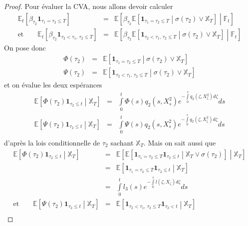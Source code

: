 \documentclass[a4paper]{article}
\theoremstyle{definition}
\theoremstyle{remark}
\begin{document}
\begin{proof}
Pour évaluer la CVA, nous allons devoir calculer 
\begin{eqnarray*}
\mathbb{E}_t \left[ \beta_{\tau_2} \mathbf{1}_{\tau_1 = \tau_2 \leq T} \right] &=& \mathbb{E} \left[ \beta_{\tau_2} \mathbb{E} \left[ \mathbf{1}_{\tau_1 = \tau_2 \leq T} \middle| \sigma (\tau_2) \vee \mathbb{X}_T \right] \middle| \mathbb{F}_t \right] \\
\text{et} \qquad
\mathbb{E}_t \left[ \beta_{\tau_2} \mathbf{1}_{\tau_2 < \tau_1,\, \tau_2 \leq T} \right] &=& \mathbb{E} \left[ \beta_{\tau_2} \mathbb{E} \left[ \mathbf{1}_{\tau_2 < \tau_1,\, \tau_2 \leq T} \middle| \sigma (\tau_2) \vee \mathbb{X}_T \right] \middle| \mathbb{F}_t \right]
\end{eqnarray*}
On pose donc
\begin{eqnarray*}
\Phi (\tau_2) &=& \mathbb{E} \left[ \mathbf{1}_{\tau_1 = \tau_2 \leq T} \middle| \sigma (\tau_2) \vee \mathbb{X}_T \right] \\
\Psi (\tau_2) &=& \mathbb{E} \left[ \mathbf{1}_{\tau_2 < \tau_1,\, \tau_2 \leq T} \middle| \sigma (\tau_2) \vee \mathbb{X}_T \right] 
\end{eqnarray*}
et on évalue les deux espérances 
\begin{eqnarray*}
\mathbb{E} \left[ \Phi (\tau_2) \mathbf{1}_{\tau_2 \leq t} \middle| \mathbb{X}_T \right] &=& \int \limits_0^t \Phi(s) q_2(s, X^2_s)e^{-\int \limits_0^s q_2(\zeta, X^2_\zeta)d\zeta} ds \\
\mathbb{E} \left[ \Psi (\tau_2) \mathbf{1}_{\tau_2 \leq t} \middle| \mathbb{X}_T \right] &=& \int \limits_0^t \Psi(s) q_2(s, X^2_s)e^{-\int \limits_0^s q_2(\zeta, X^2_\zeta)d\zeta} ds \\
\end{eqnarray*}
d'après la lois conditionnelle de $\tau_2$ sachant $\mathbb{X}_T$. Mais on sait aussi que
\begin{eqnarray*}
\mathbb{E} \left[ \Phi (\tau_2) \mathbf{1}_{\tau_2 \leq t} \middle| \mathbb{X}_T \right] &=&  \mathbb{E} \left[ \mathbb{E} \left[ \mathbf{1}_{\tau_1 = \tau_2 \leq T} \mathbf{1}_{\tau_2 \leq t} \middle| \mathbb{X}_T \vee \sigma (\tau_2) \right] \middle| \mathbb{X}_T \right] \\
&=& \mathbb{E} \left[ \mathbf{1}_{\tau_1 = \tau_2 \leq T} \mathbf{1}_{\tau_2 \leq t} \middle| \mathbb{X}_T \right] \\
&=& \int \limits_0^t l_3(s) e^{-\int \limits_0^s l(\zeta, X_\zeta) d\zeta} ds \\
\text{et} \qquad \mathbb{E} \left[ \Psi (\tau_2) \mathbf{1}_{\tau_2 \leq t} \middle| \mathbb{X}_T \right] &=& \mathbb{E} \left[ \mathbf{1}_{\tau_2 < \tau_1,\, \tau_2 \leq T} \mathbf{1}_{\tau_2 < t} \middle| \mathbb{X}_T \right] \\

\end{eqnarray*}
\end{proof}
\end{document}

